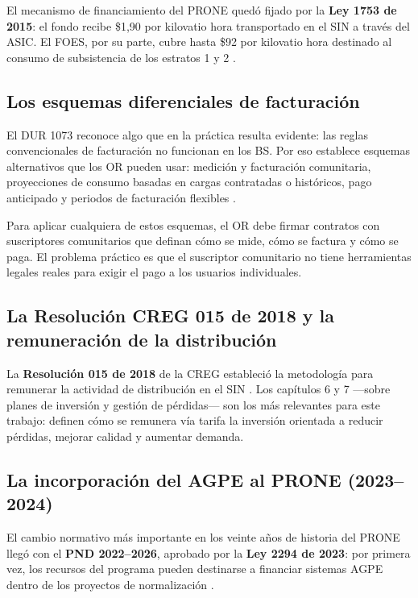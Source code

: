 El mecanismo de financiamiento del PRONE quedó fijado por la \textbf{Ley 1753 de 2015}: el fondo recibe \$1,90 por kilovatio hora transportado en el SIN a través del ASIC. El FOES, por su parte, cubre hasta \$92 por kilovatio hora destinado al consumo de subsistencia de los estratos 1 y 2 \parencite{Ley1753_2015}.

\subsection{Los esquemas diferenciales de facturación}
\label{subsec:esquemas_diferenciales}

El DUR 1073 reconoce algo que en la práctica resulta evidente: las reglas convencionales de facturación no funcionan en los BS. Por eso establece esquemas alternativos que los OR pueden usar: medición y facturación comunitaria, proyecciones de consumo basadas en cargas contratadas o históricos, pago anticipado y periodos de facturación flexibles \parencite{DUR1073_2015}.

Para aplicar cualquiera de estos esquemas, el OR debe firmar contratos con suscriptores comunitarios que definan cómo se mide, cómo se factura y cómo se paga. El problema práctico es que el suscriptor comunitario no tiene herramientas legales reales para exigir el pago a los usuarios individuales.

\subsection{La Resolución CREG 015 de 2018 y la remuneración de la distribución}
\label{subsec:resolucion015}

La \textbf{Resolución 015 de 2018} de la CREG estableció la metodología para remunerar la actividad de distribución en el SIN \parencite{ResolucionCREG015_2018}. Los capítulos 6 y 7 —sobre planes de inversión y gestión de pérdidas— son los más relevantes para este trabajo: definen cómo se remunera vía tarifa la inversión orientada a reducir pérdidas, mejorar calidad y aumentar demanda.

\subsection{La incorporación del AGPE al PRONE (2023--2024)}
\label{subsec:agpe_prone}

El cambio normativo más importante en los veinte años de historia del PRONE llegó con el \textbf{PND 2022--2026}, aprobado por la \textbf{Ley 2294 de 2023}: por primera vez, los recursos del programa pueden destinarse a financiar sistemas AGPE dentro de los proyectos de normalización \parencite{Ley2294_2023}.

